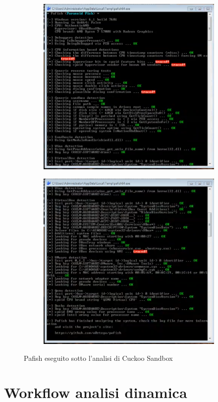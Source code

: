 \begin{figure}[H]
\centering
\begin{subfigure}{.5\textwidth}
  \centering
  \includegraphics[width=.9\linewidth]{assets/pafish_cuckoo_1.png}
\end{subfigure}%
\begin{subfigure}{.5\textwidth}
  \centering
  \includegraphics[width=.9\linewidth]{assets/pafish_cuckoo_2.png}
\end{subfigure}
\caption{Pafish eseguito sotto l'analisi di Cuckoo Sandbox}
\label{fig:pafish_cuckoo}
\end{figure}

\section{Workflow analisi dinamica}
